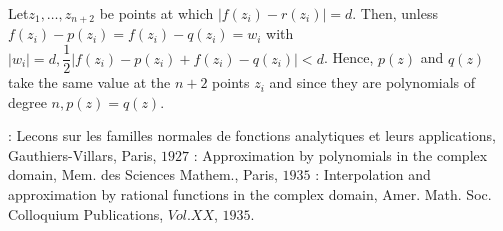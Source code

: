 Let\pageoriginale $z_1, \ldots, z_{n+2}$ be points at which $| f(z_i) - r(z_i) | =
d$. Then, unless $f(z_i)-p(z_i)=f(z_i)-q(z_i)= w_i$ with $| w_i |= d,
\dfrac{1}{2} | f(z_i)- p(z_i) + f(z_i) -q(z_i) | < d$. Hence, $p(z)$
and $q(z)$ take the same value at the $n+2$ points $z_i$ and since
they are polynomials of degree $n,p(z) = q(z)$.  

\begin{thebibliography}{99}
 : Lecons sur les familles normales de
  fonctions analytiques et leurs applications, Gauthiers-Villars,
  Paris, $1927$ 
 : Approximation by polynomials in the
  complex domain, Mem. des Sciences Mathem., Paris, $1935$ 
 : Interpolation and approximation by
  rational functions in the complex domain,
  Amer. Math. Soc. Colloquium Publications, $Vol.XX$, $1935$. 
\end{thebibliography}

